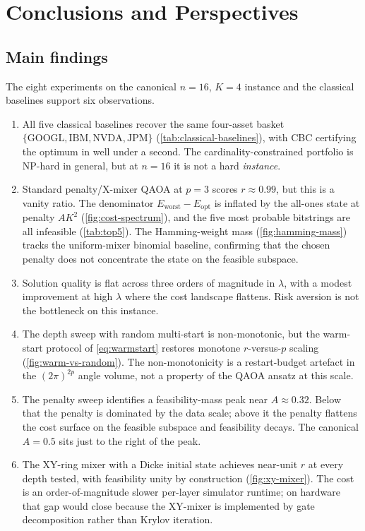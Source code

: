 \section{Conclusions and Perspectives}\label{section:conclusion}

\subsection{Main findings}

The eight experiments on the canonical $n=16$, $K=4$ instance and the classical baselines support six observations.

\begin{enumerate}
    \item All five classical baselines recover the same four-asset basket $\{\text{GOOGL}, \text{IBM}, \text{NVDA}, \text{JPM}\}$ (\cref{tab:classical-baselines}), with CBC certifying the optimum in well under a second. The cardinality-constrained portfolio is NP-hard in general, but at $n=16$ it is not a hard \emph{instance}.
    \item Standard penalty/X-mixer QAOA at $p=3$ scores $r \approx 0.99$, but this is a vanity ratio. The denominator $E_{\text{worst}} - E_{\text{opt}}$ is inflated by the all-ones state at penalty $AK^2$ (\cref{fig:cost-spectrum}), and the five most probable bitstrings are all infeasible (\cref{tab:top5}). The Hamming-weight mass (\cref{fig:hamming-mass}) tracks the uniform-mixer binomial baseline, confirming that the chosen penalty does not concentrate the state on the feasible subspace.
    \item Solution quality is flat across three orders of magnitude in $\lambda$, with a modest improvement at high $\lambda$ where the cost landscape flattens. Risk aversion is not the bottleneck on this instance.
    \item The depth sweep with random multi-start is non-monotonic, but the warm-start protocol of \cref{eq:warmstart} restores monotone $r$-versus-$p$ scaling (\cref{fig:warm-vs-random}). The non-monotonicity is a restart-budget artefact in the $(2\pi)^{2p}$ angle volume, not a property of the QAOA ansatz at this scale.
    \item The penalty sweep identifies a feasibility-mass peak near $A \approx 0.32$. Below that the penalty is dominated by the data scale; above it the penalty flattens the cost surface on the feasible subspace and feasibility decays. The canonical $A=0.5$ sits just to the right of the peak.
    \item The XY-ring mixer with a Dicke initial state achieves near-unit $r$ at every depth tested, with feasibility unity by construction (\cref{fig:xy-mixer}). The cost is an order-of-magnitude slower per-layer simulator runtime; on hardware that gap would close because the XY-mixer is implemented by gate decomposition rather than Krylov iteration.
\end{enumerate}

